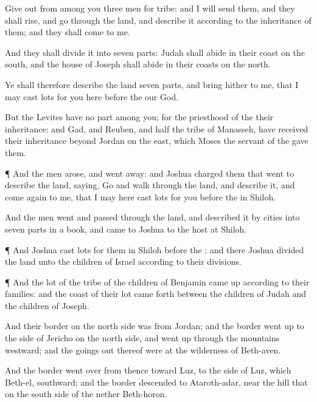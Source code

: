 {Give
out from among you
three
men for
{}
tribe: and I will
send them, and they shall
rise, and
go through the
land, and
describe it
according to the
inheritance of them; and they shall
come
{} to me.

And they shall
divide it into
seven
parts:
Judah shall
abide in their
coast on the
south, and the
house of
Joseph shall
abide in their
coasts on the
north.

Ye shall therefore
describe the
land
{}
seven
parts, and
bring
{} hither to me, that I may
cast
lots for you here
before the
{} our
God.

But the
Levites have no
part
among you; for the
priesthood of the
{}
{} their
inheritance: and
Gad, and
Reuben, and
half the
tribe of
Manasseh, have
received their
inheritance
beyond
Jordan on the
east, which
Moses the
servant of the
{}
gave them.


\par }{\PP {}¶ And the
men
arose, and went
away: and
Joshua
charged them that
went to
describe the
land,
saying,
Go and
walk through the
land, and
describe it, and come
again to me, that I may here
cast
lots for you
before the
{} in
Shiloh.

And the
men
went and passed
through the
land, and
described it by
cities into
seven
parts in a
book, and
came
{} to
Joshua to the
host at
Shiloh.


\par }{\PP {}¶ And
Joshua
cast
lots for them in
Shiloh
before the
{}: and there
Joshua
divided the
land unto the
children of
Israel according to their
divisions.


\par }{\PP {}¶ And the
lot of the
tribe of the
children of
Benjamin came
up according to their
families: and the
coast of their
lot came
forth between the
children of
Judah and the
children of
Joseph.

And their
border on the
north
side was from
Jordan; and the
border went
up to the
side of
Jericho on the
north side, and went
up through the
mountains
westward; and the goings
out thereof were at the
wilderness of
Beth-aven.

And the
border went
over from thence toward
Luz, to the
side of
Luz, which
{}
Beth-el,
southward; and the
border
descended to
Ataroth-adar, near the
hill that
{} on the south
side of the
nether
Beth-horon.

}
